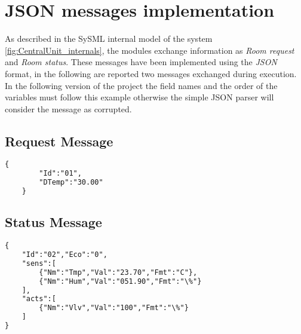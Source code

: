 \section{JSON messages implementation}
As described in the SySML internal model of the system \ref{fig:CentralUnit_internals}, the modules exchange information as \textit{Room request} and \textit{Room status}.
These messages have been implemented using the \textit{JSON} format, in the following are reported two messages exchanged during execution.
In the following version of the project the field names and the order of the variables must follow this example otherwise the simple JSON parser will consider the message as corrupted.

\subsection{Request Message}
\lstset{style=custompython}
\begin{lstlisting}[language=XML]
	{
		"Id":"01",
		"DTemp":"30.00"
	}
\end{lstlisting}

\subsection{Status Message}
\lstset{style=custompython}
\begin{lstlisting}[language=XML]
{
	"Id":"02","Eco":"0",
	"sens":[
		{"Nm":"Tmp","Val":"23.70","Fmt":"C"},
		{"Nm":"Hum","Val":"051.90","Fmt":"\%"}
	],
	"acts":[
		{"Nm":"Vlv","Val":"100","Fmt":"\%"}
	]
}
\end{lstlisting}